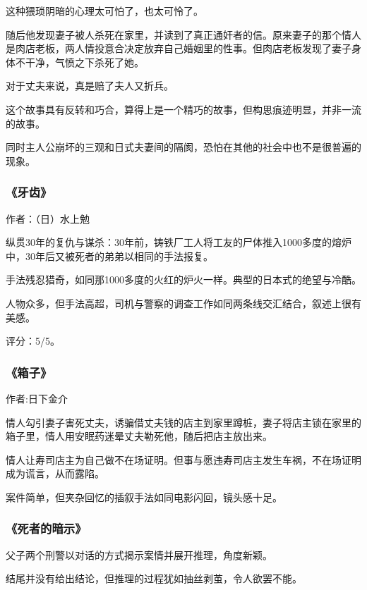 这种猥琐阴暗的心理太可怕了，也太可怜了。

随后他发现妻子被人杀死在家里，并读到了真正通奸者的信。原来妻子的那个情人是肉店老板，两人情投意合决定放弃自己婚姻里的性事。但肉店老板发现了妻子身体不干净，气愤之下杀死了她。

对于丈夫来说，真是赔了夫人又折兵。

这个故事具有反转和巧合，算得上是一个精巧的故事，但构思痕迹明显，并非一流的故事。

同时主人公崩坏的三观和日式夫妻间的隔阂，恐怕在其他的社会中也不是很普遍的现象。

\subsubsection{《牙齿》}

作者：（日）水上勉

纵贯30年的复仇与谋杀：30年前，铸铁厂工人将工友的尸体推入1000多度的熔炉中，30年后又被死者的弟弟以相同的手法报复。

手法残忍猎奇，如同那1000多度的火红的炉火一样。典型的日本式的绝望与冷酷。

人物众多，但手法高超，司机与警察的调查工作如同两条线交汇结合，叙述上很有美感。

评分：5/5。

\subsubsection{《箱子》}

作者:日下金介

情人勾引妻子害死丈夫，诱骗借丈夫钱的店主到家里蹲桩，妻子将店主锁在家里的箱子里，情人用安眠药迷晕丈夫勒死他，随后把店主放出来。

情人让寿司店主为自己做不在场证明。但事与愿违寿司店主发生车祸，不在场证明成为谎言，从而露陷。

案件简单，但夹杂回忆的插叙手法如同电影闪回，镜头感十足。

\subsubsection{《死者的暗示》}

父子两个刑警以对话的方式揭示案情并展开推理，角度新颖。

结尾并没有给出结论，但推理的过程犹如抽丝剥茧，令人欲罢不能。
